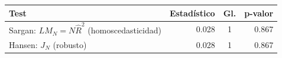 
\begin{tabular}{lrcr}
\toprule
Test & Estadístico & Gl. & p-valor\\
\midrule
Sargan: $LM_N=N\hat R^2$ (homoscedasticidad) & 0.028 & 1 & 0.867\\
Hansen: $J_N$ (robusto) & 0.028 & 1 & 0.867\\
\bottomrule
\end{tabular}
